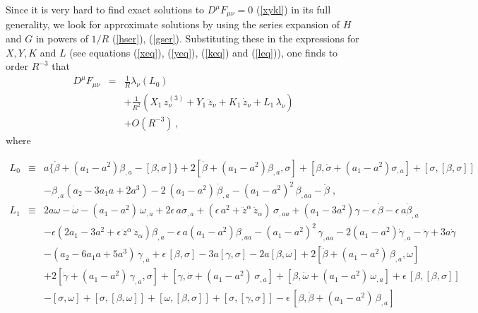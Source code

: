 \documentclass[a4paper,twocolumn,prd,showpacs,amsmath,amssymb]{revtex4}
\begin{document}
Since it is very hard to find exact solutions to
$D^{\mu} F_{\mu\nu} = 0$ (\ref{xykl}) in its full generality, we look
for approximate solutions by using the series expansion of $H$ and $G$
in powers of $1/R$ (\ref{hser}), (\ref{gser}). Substituting these
in the expressions for $X, Y, K$ and $L$ (see equations (\ref{xeq}),
(\ref{yeq}), (\ref{keq}) and (\ref{leq})), one finds to order $R^{-3}$ that
\begin{eqnarray*}
D^{\mu} F_{\mu\nu} & = & \frac{1}{R} \lambda_{\nu} (L_{0}) \\
& & + \frac{1}{R^2} (X_{1} \, z^{(3)}_{\nu} + Y_{1} \, \ddot{z}_{\nu}
+ K_{1} \, \dot{z}_{\nu} + L_{1} \, \lambda_{\nu}) \\
& & + O(R^{-3}) \, ,
\end{eqnarray*}
where
\begin{widetext}
\begin{eqnarray}
L_{0} & \equiv & a \{ \dot{\beta} +  (a_{1} - a^2) \beta_{,a} - [\beta,\sigma] \}
+ 2 [\dot{\beta} +  (a_{1} - a^2) \beta_{,a}, \sigma]
+ [\beta, \dot{\sigma} +  (a_{1} - a^2) \sigma_{,a}] + [\sigma,[\beta,\sigma]]
\nonumber \\
& & - \beta_{,a} (a_{2} - 3 a_{1} a + 2 a^{3})
- 2 \, (a_{1} - a^2) \, \dot{\beta}_{,a} - (a_{1} - a^2)^2 \, \beta_{,aa}
- \ddot{\beta} \; , \label{l0eq} \\
L_{1} & \equiv & 2 a \omega - \dot{\omega} - (a_{1} - a^2) \, \omega_{,a}
+ 2 \epsilon \, a \sigma_{,a} + (\epsilon \, a^2 + \ddot{z}^{\alpha} \, \ddot{z}_{\alpha}) \,
\sigma_{,aa} + (a_{1} - 3 a^2) \gamma - \epsilon \, \dot{\beta}
- \epsilon \, a \dot{\beta}_{,a} \nonumber \\
& & - \epsilon (2 a_{1} - 3 a^2 + \epsilon \, \ddot{z}^{\alpha} \, \ddot{z}_{\alpha}) \beta_{,a}
- \epsilon \, a (a_{1} - a^2) \beta_{,aa} - (a_{1} - a^2)^{2} \, \gamma_{,aa}
- 2 (a_{1} - a^2) \dot{\gamma}_{,a} - \ddot{\gamma} + 3 a \dot{\gamma}
\nonumber \\
& & - (a_{2} - 6 a_{1} a + 5 a^3) \, \gamma_{,a} + \epsilon \, [\beta,\sigma]
- 3 a [\gamma,\sigma]
- 2 a [\beta,\omega] + 2 [\dot{\beta} +  (a_{1} - a^2) \, \beta_{,a},\omega]
\nonumber \\
& & + 2 [\dot{\gamma} +  (a_{1} - a^2) \, \gamma_{,a},\sigma]
+ [\gamma,\dot{\sigma} +  (a_{1} - a^2) \, \sigma_{,a}]
+ [\beta,\dot{\omega} +  (a_{1} - a^2) \, \omega_{,a}]
+ \epsilon \, [\beta,[\beta,\sigma]] \nonumber \\
& & - [\sigma,\omega] + [\sigma,[\beta,\omega]]
+ [\omega,[\beta,\sigma]] + [\sigma,[\gamma,\sigma]]
- \epsilon \, [\beta,\dot{\beta} +  (a_{1} - a^2) \, \beta_{,a}]

\end{eqnarray}
\end{widetext}
\end{document}
